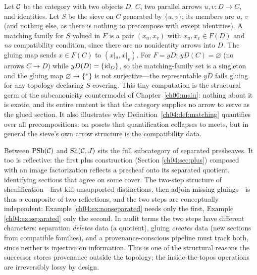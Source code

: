 \begin{example}\label{ch04:ex:nonposet}
Let $\mathcal{C}$ be the category with two objects $D$, $C$, two parallel arrows
$u,v:D\to C$, and identities. Let $S$ be the sieve on $C$ generated by
$\{u,v\}$; its members are $u$, $v$ (and nothing else, as there is nothing to
precompose with except identities). A matching family for $S$ valued in $F$
is a pair $(x_u,x_v)$ with $x_u,x_v\in F(D)$ and \emph{no} compatibility
condition, since there are no nonidentity arrows into $D$. The gluing map
sends $x\in F(C)$ to $(x|_u,x|_v)$. For $F=yD$: $yD(C)=\varnothing$ (no
arrows $C\to D$) while $yD(D)=\{\mathrm{id}_D\}$, so the matching-family set is a
singleton and the gluing map $\varnothing\to\{*\}$ is not surjective---the
representable $yD$ fails gluing for any topology declaring $S$ covering. This
tiny computation is the structural germ of the subcanonicity countermodel of
Chapter~\ref{ch06:main}: nothing about it is exotic, and its entire content
is that the category supplies no arrow to serve as the glued section. It also
illustrates why Definition~\ref{ch04:def:matching} quantifies over all
precompositions: on posets that quantification collapses to meets, but in
general the sieve's own arrow structure is the compatibility data.
\end{example}

\begin{remark}
\label{ch04:rem:separated}
Between $\mathrm{PSh}(\mathcal{C})$ and $\mathrm{Sh}(\mathcal{C},J)$ sits the full subcategory of separated
presheaves. It too is reflective: the first plus construction (Section
\ref{ch04:sec:plus}) composed with an image factorization reflects a presheaf
onto its separated quotient, identifying sections that agree on some cover.
The two-step structure of sheafification---first kill unsupported
distinctions, then adjoin missing gluings---is thus a composite of two
reflections, and the two steps are conceptually independent: Example
\ref{ch04:ex:nonseparated} needs only the first, Example
\ref{ch04:ex:separated} only the second. In audit terms the two steps have
different characters: separation \emph{deletes} data (a quotient), gluing
\emph{creates} data (new sections from compatible families), and a
provenance-conscious pipeline must track both, since neither is injective on
information. This is one of the structural reasons the successor stores
provenance outside the topology; the inside-the-topos operations are
irreversibly lossy by design.
\end{remark}

